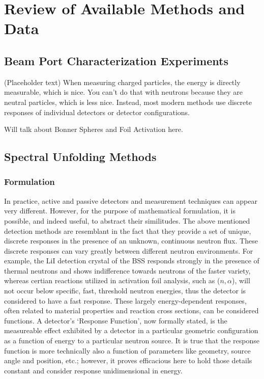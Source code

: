 \cleardoublepage

\chapter{Review of Available Methods and Data}


\section{Beam Port Characterization Experiments}

(Placeholder text)
When measuring charged particles, the energy is directly measurable, which is nice.
You can't do that with neutrons because they are neutral particles, which is less nice.
Instead, most modern methods use discrete responses of individual detectors or detector configurations.

Will talk about Bonner Spheres and Foil Activation here.

\section{Spectral Unfolding Methods}


\subsection{Formulation}


In practice, active and passive detectors and measurement techniques can appear very different.
However, for the purpose of mathematical formulation, it is possible, and indeed useful, to abstract their similitudes.
The above mentioned detection methods are resemblant in the fact that they provide a set of unique, discrete responses in the presence of an unknown, continuous neutron flux.
These discrete responses can vary greatly between different neutron environments.
For example, the LiI detection crystal of the BSS responds strongly in the presence of thermal neutrons and shows indifference towards neutrons of the faster variety, whereas certian reactions utilized in activation foil analysis, such as ($n, \alpha$), will not occur below specific, fast, threshold neutron energies, thus the detector is considered to have a fast response.
These largely energy-dependent responses, often related to material properties and reaction cross sections, can be considered functions.
A detector's `Response Function', now formally stated, is the measureable effect exhibited by a detector in a particular geometric configuration as a function of energy to a particular neutron source.
It is true that the response function is more technically also a function of parameters like geometry, source angle and position, etc.; however, it proves efficacious here to hold those details constant and consider response unidimensional in energy.


